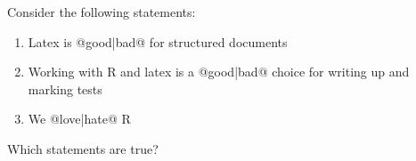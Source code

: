 \documentclass[10pt]{examdesign}
\begin{document}
\begin{multiplechoice}[resetcounter=no,  examcolumns=1]
\begin{question}


\end{question}


\begin{question}

	Consider the following statements:

	\begin{enumerate}[I]
		\item Latex is @{good}|{bad}@ for structured documents

		\item Working with R and latex is a @{good}|{bad}@ choice for writing up and marking tests

		\item We @{love}|{hate}@ R

	\end{enumerate}

	Which statements are true?


\end{question}

\end{multiplechoice}
\end{document}
